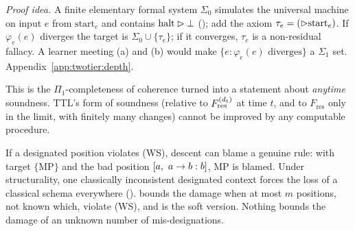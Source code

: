 \noindent\emph{Proof idea.} A finite elementary formal system $\Sigma_0$ simulates the universal machine on input $e$ from $\mathrm{start}_e$ and contains $\mathrm{halt}\rhd\bot$ (); add the axiom $\tau_e=(\rhd\mathrm{start}_e)$. If $\varphi_e(e)$ diverges the target is $\Sigma_0\cup\{\tau_e\}$; if it converges, $\tau_e$ is a non-residual fallacy. A learner meeting (a) and (b) would make $\{e:\varphi_e(e)\text{ diverges}\}$ a $\Sigma_1$ set. Appendix~\ref{app:twotier:depth}.

This is the $\Pi_1$-completeness of coherence turned into a statement about \emph{anytime} soundness. TTL's form of soundness (relative to $F^{(d_t)}_{\mathrm{res}}$ at time $t$, and to $F_{\mathrm{res}}$ only in the limit, with finitely many changes) cannot be improved by any computable procedure.

\begin{proposition}\label{prop:twotier:designation}
If a designated position violates (WS), descent can blame a genuine rule: with target $\{\mathrm{MP}\}$ and the bad position $[a,\ a\to b : b]$, MP is blamed. Under structurality, one classically inconsistent designated context forces the loss of a classical schema everywhere ().  bounds the damage when at most $m$ positions, not known which, violate (WS), and  is the soft version. Nothing bounds the damage of an unknown number of mis-designations.
\end{proposition}

